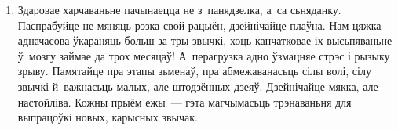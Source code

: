 \begin{enumerate}[itemindent=3em,labelwidth=1.5em,leftmargin=0pt,nosep]
  \item Здаровае харчаваньне пачынаецца не з~панядзелка, а~са сьняданку. Паспрабуйце не мяняць рэзка свой рацыён, дзейнічайце плаўна. Нам цяжка адначасова ўкараняць больш за тры звычкі, хоць канчатковае іх высьпяваньне ў~мозгу займае да трох месяцаў! А~перагрузка адно ўзмацняе стрэс і рызыку зрыву. Памятайце пра этапы зьменаў, пра абмежаванасьць сілы волі, сілу звычкі й~важнасьць малых, але штодзённых дзеяў. Дзейнічайце мякка, але настойліва. Кожны прыём ежы~--- гэта магчымасьць трэнаваньня для выпрацоўкі новых, карысных звычак.
\end{enumerate}
